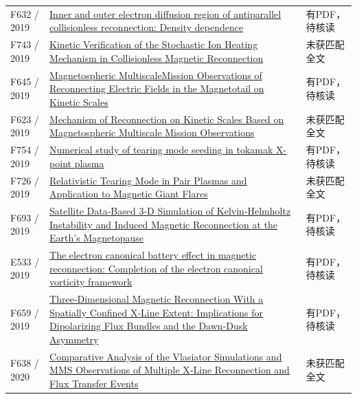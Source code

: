 \begin{longtable}{P{24mm}P{97mm}P{27mm}}
F632 / 2019 & \href{https://doi.org/10.1063/1.5109368}{Inner and outer electron diffusion region of antiparallel collisionless reconnection: Density dependence} & 有PDF，待核读\\

F743 / 2019 & \href{https://doi.org/10.3847/2041-8213/ab5b0a}{Kinetic Verification of the Stochastic Ion Heating Mechanism in Collisionless Magnetic Reconnection} & 未获匹配全文\\

F645 / 2019 & \href{https://doi.org/10.1029/2019gl083782}{Magnetospheric MultiscaleMission Observations of Reconnecting Electric Fields in the Magnetotail on Kinetic Scales} & 有PDF，待核读\\

F623 / 2019 & \href{https://doi.org/10.3847/2041-8213/ab4b5a}{Mechanism of Reconnection on Kinetic Scales Based on Magnetospheric Multiscale Mission Observations} & 未获匹配全文\\

F754 / 2019 & \href{https://doi.org/10.1063/1.5086402}{Numerical study of tearing mode seeding in tokamak X-point plasma} & 有PDF，待核读\\

F726 / 2019 & \href{https://doi.org/10.3847/1538-4357/ab29f6}{Relativistic Tearing Mode in Pair Plasmas and Application to Magnetic Giant Flares} & 未获匹配全文\\

F693 / 2019 & \href{https://doi.org/10.1029/2019gl083282}{Satellite Data‐Based 3‐D Simulation of Kelvin‐Helmholtz Instability and Induced Magnetic Reconnection at the Earth's Magnetopause} & 有PDF，待核读\\

E533 / 2019 & \href{https://doi.org/10.1063/1.5122225}{The electron canonical battery effect in magnetic reconnection: Completion of the electron canonical vorticity framework} & 有PDF，待核读\\

F659 / 2019 & \href{https://doi.org/10.1029/2019ja026539}{Three‐Dimensional Magnetic Reconnection With a Spatially Confined X‐Line Extent: Implications for Dipolarizing Flux Bundles and the Dawn‐Dusk Asymmetry} & 有PDF，待核读\\

F638 / 2020 & \href{https://doi.org/10.1029/2019ja027410}{Comparative Analysis of the Vlasiator Simulations and MMS Observations of Multiple X‐Line Reconnection and Flux Transfer Events} & 未获匹配全文\\


\end{longtable}
